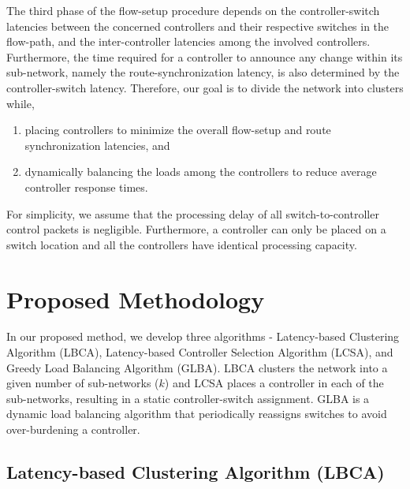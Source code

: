 \documentclass[a4paper,fleqn]{cas-dc}
\begin{document}
The third phase of the flow-setup procedure depends on the controller-switch latencies between the concerned controllers and their respective switches in the flow-path, and the inter-controller latencies among the involved controllers. Furthermore, the time required for a controller to announce any change within its sub-network, namely the route-synchronization latency, is also determined by the controller-switch latency. Therefore, our goal is to divide the network into clusters while,
\begin{enumerate}
	\item placing controllers to minimize the overall flow-setup and route synchronization latencies, and
	\item dynamically balancing the loads among the controllers to reduce average controller response times.
\end{enumerate}
For simplicity, we assume that the processing delay of all switch-to-controller control packets is negligible. Furthermore, a controller can only be placed on a switch location and all the controllers have identical processing capacity.


\section{Proposed Methodology} \label{proposal}

\noindent In our proposed method, we develop three algorithms - Latency-based Clustering Algorithm (LBCA), Latency-based Controller Selection Algorithm (LCSA), and Greedy Load Balancing Algorithm (GLBA). LBCA clusters the network into a given number of sub-networks ($k$) and LCSA places a controller in each of the sub-networks, resulting in a static controller-switch assignment. GLBA is a dynamic load balancing algorithm that periodically reassigns switches to avoid over-burdening a controller.

\subsection{Latency-based Clustering Algorithm (LBCA)} \label{lbca}
\end{document}
